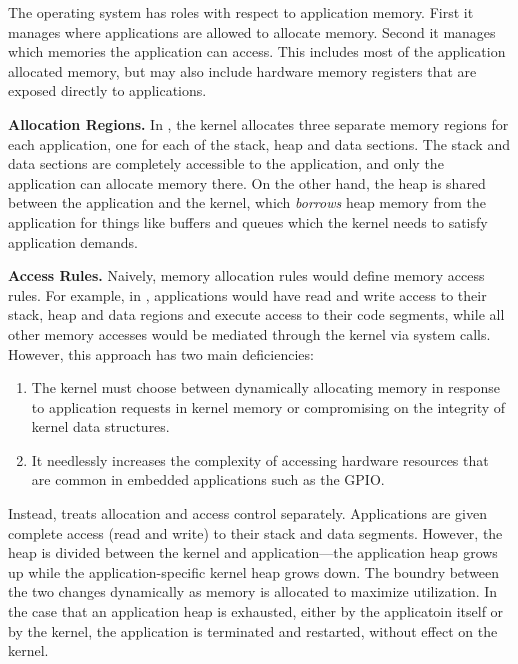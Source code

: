 The operating system has roles with respect to application memory. First it
manages where applications are allowed to allocate memory. Second it manages
which memories the application can access. This includes most of the application
allocated memory, but may also include hardware memory registers that are
exposed directly to applications.

{\bf Allocation Regions.} 
In \name, the kernel allocates three separate memory regions for each
application, one for each of the stack, heap and data sections. The stack and
data sections are completely accessible to the application, and only the
application can allocate memory there. On the other hand, the heap is shared
between the application and the kernel, which \emph{borrows} heap memory from
the application for things like buffers and queues which the kernel needs
to satisfy application demands.

{\bf Access Rules.}
Naively, memory allocation rules would define memory access rules. For example,
in \name, applications would have read and write access to their stack, heap and
data regions and execute access to their code segments, while all other memory
accesses would be mediated through the kernel via system calls. However, this
approach has two main deficiencies:

\begin{enumerate}
  \item The kernel must choose between dynamically allocating memory in response to
  application requests in kernel memory or compromising on the integrity of
  kernel data structures.

  \item It needlessly increases the complexity of accessing hardware resources
  that are common in embedded applications such as the GPIO.

\end{enumerate}

Instead, \name treats allocation and access control separately. Applications are
given complete access (read and write) to their stack and data segments.
However, the heap is divided between the kernel and application---the
application heap grows up while the application-specific kernel heap grows down.
The boundry between the two changes dynamically as memory is allocated to
maximize utilization. In the case that an application heap is exhausted, either
by the applicatoin itself or by the kernel, the application is terminated and
restarted, without effect on the kernel.
